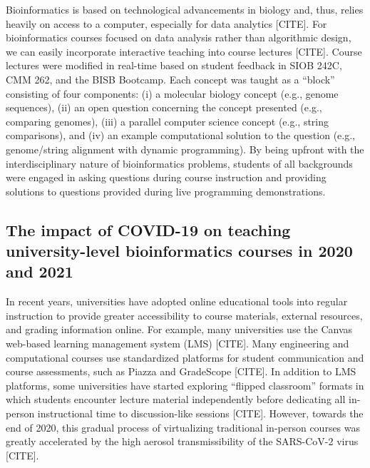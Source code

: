 Bioinformatics is based on technological advancements in biology and, thus, relies heavily on access to a computer, especially for data analytics [CITE]. For bioinformatics courses focused on data analysis rather than algorithmic design, we can easily incorporate interactive teaching into course lectures [CITE]. Course lectures were modified in real-time based on student feedback in SIOB 242C, CMM 262, and the BISB Bootcamp. Each concept was taught as a “block” consisting of four components: (i) a molecular biology concept (e.g., genome sequences), (ii) an open question concerning the concept presented (e.g., comparing genomes), (iii) a parallel computer science concept (e.g., string comparisons), and (iv) an example computational solution to the question (e.g., genome/string alignment with dynamic programming). By being upfront with the interdisciplinary nature of bioinformatics problems, students of all backgrounds were engaged in asking questions during course instruction and providing solutions to questions provided during live programming demonstrations. 

\subsection{The impact of COVID-19 on teaching university-level bioinformatics courses in 2020 and 2021}

In recent years, universities have adopted online educational tools into regular instruction to provide greater accessibility to course materials, external resources, and grading information online. For example, many universities use the Canvas web-based learning management system (LMS) [CITE]. Many engineering and computational courses use standardized platforms for student communication and course assessments, such as Piazza and GradeScope [CITE]. In addition to LMS platforms, some universities have started exploring “flipped classroom” formats in which students encounter lecture material independently before dedicating all in-person instructional time to discussion-like sessions [CITE]. However, towards the end of 2020, this gradual process of virtualizing traditional in-person courses was greatly accelerated by the high aerosol transmissibility of the SARS-CoV-2 virus [CITE]. 

